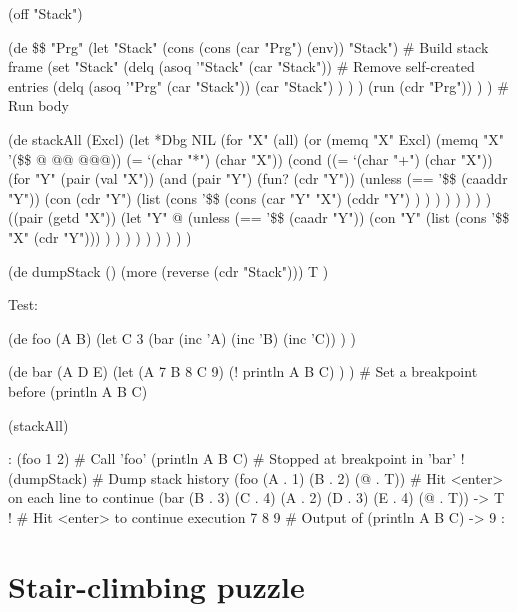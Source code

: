 \begin{itemize}
\begin{wideverbatim}
(off "Stack")

(de \$\$ "Prg"
   (let "Stack" (cons (cons (car "Prg") (env)) "Stack")  # Build stack frame
      (set "Stack"
         (delq (asoq '"Stack" (car "Stack"))  # Remove self-created entries
            (delq (asoq '"Prg" (car "Stack"))
               (car "Stack") ) ) )
      (run (cdr "Prg")) ) )  # Run body


(de stackAll (Excl)
   (let *Dbg NIL
      (for "X" (all)
         (or
            (memq "X" Excl)
            (memq "X" '(\$\$ @ @@ @@@))
            (= `(char "*") (char "X"))
            (cond
               ((= `(char "+") (char "X"))
                  (for "Y" (pair (val "X"))
                     (and
                        (pair "Y")
                        (fun? (cdr "Y"))
                        (unless (== '\$\$ (caaddr "Y"))
                           (con (cdr "Y")
                              (list
                                 (cons '\$\$
                                    (cons (car "Y" "X")
                                       (cddr "Y") ) ) ) ) ) ) ) )
               ((pair (getd "X"))
                  (let "Y" @
                     (unless (== '\$\$ (caadr "Y"))
                        (con "Y"
                           (list (cons '\$\$ "X" (cdr "Y"))) ) ) ) ) ) ) ) ) )

\end{wideverbatim}

\begin{wideverbatim}

(de dumpStack ()
   (more (reverse (cdr "Stack")))
   T )

Test:

(de foo (A B)
   (let C 3
      (bar (inc 'A) (inc 'B) (inc 'C)) ) )

(de bar (A D E)
   (let (A 7  B 8  C 9)
      (! println A B C) ) )  # Set a breakpoint before (println A B C)

(stackAll)

: (foo 1 2)  # Call 'foo'
(println A B C)  # Stopped at breakpoint in 'bar'
! (dumpStack)  # Dump stack history
(foo (A . 1) (B . 2) (@ . T))  # Hit <enter> on each line to continue
(bar (B . 3) (C . 4) (A . 2) (D . 3) (E . 4) (@ . T))
-> T
!  # Hit <enter> to continue execution
7 8 9  # Output of (println A B C)
-> 9
:

\end{wideverbatim}

\pagebreak{}
\section*{Stair-climbing puzzle}


\end{itemize}
